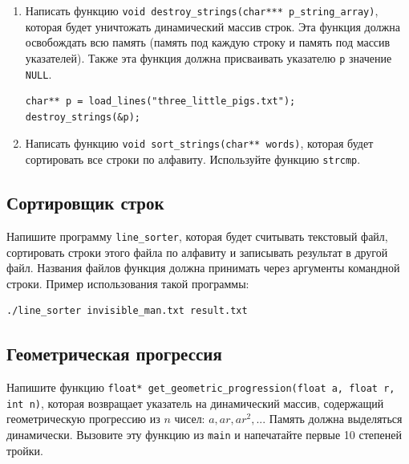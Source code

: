 \documentclass[10pt]{article}
\begin{document}
\begin{enumerate}
\item Написать функцию \texttt{void destroy\_strings(char*** p\_string\_array)}, которая будет уничтожать динамический массив строк. Эта функция должна освобождать всю память (память под каждую строку и память под массив указателей). Также эта функция должна присваивать указателю \texttt{p} значение \texttt{NULL}.
\begin{lstlisting}
char** p = load_lines("three_little_pigs.txt");
destroy_strings(&p);
\end{lstlisting}

\item Написать функцию \texttt{void sort\_strings(char** words)}, которая будет сортировать все строки по алфавиту. Используйте функцию \texttt{strcmp}.
\end{enumerate}

\subsection{Сортировщик строк}
Напишите программу \texttt{line\_sorter}, которая будет считывать текстовый файл, сортировать строки этого файла по алфавиту и записывать результат в другой файл. Названия файлов функция должна принимать через аргументы командной строки.
Пример использования такой программы:

\begin{verbatim}
./line_sorter invisible_man.txt result.txt
\end{verbatim}


\subsection{Геометрическая прогрессия}
Напишите функцию \texttt{float* get\_geometric\_progression(float a, float r, int n)}, которая возвращает указатель на динамический массив, содержащий геометрическую прогрессию из $n$ чисел: 
$a, ar, ar^2, ...$ 
Память должна выделяться динамически. Вызовите эту функцию из \texttt{main} и напечатайте первые 10 степеней тройки.
\end{document}
